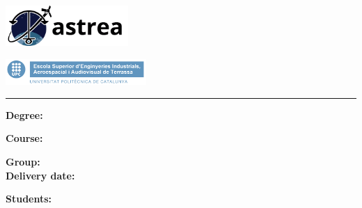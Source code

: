 
\thispagestyle{CoverPage}


\begin{center}\bf

\includegraphics[width=0.35\textwidth]{./doc_config/images/logo.png}

\vspace{50pt}

{\large \School}

\vspace{10pt}

\includegraphics[width=0.4\textwidth]{./doc_config/images/UPC_ESEIAAT.jpg}

\vspace{40pt}

{\fontsize{30pt}{20pt}\selectfont \ProjectName}

\vspace{10pt}

{\Huge \Acronym}


\textcolor{UPC_blue}{\rule{\textwidth}{.6pt}}

{\Large \DocType}

\end{center}

\vspace{10pt}

\textbf{Degree:} \Degree

\textbf{Course:} \Course

\textbf{Group:} \GrCode\\

\textbf{Delivery date:} \DocDate\\

\vspace{10pt}

\textbf{Students:}\vspace{7pt}

